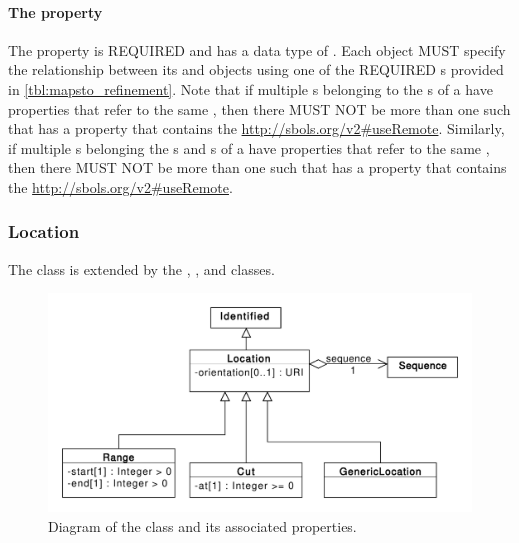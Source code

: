 \paragraph{The  property}\label{sec:refinement}
The  property is REQUIRED and has a data type of . Each  object MUST specify the relationship between its  and   objects using one of the REQUIRED  s provided in \ref{tbl:mapsto_refinement}.
Note that if multiple s belonging to the s of a  have  properties that refer to the same , then there MUST NOT be more than one such  that has a  property that contains the  \url{http://sbols.org/v2\#useRemote}. Similarly, if multiple s belonging the s and s of a  have  properties that refer to the same , then there MUST NOT be more than one such  that has a  property that contains the  \url{http://sbols.org/v2\#useRemote}.


\subsubsection{Location}
\label{sec:Location}
The  class is extended by the , , and  classes.

\begin{figure}[ht]
\begin{center}
\includegraphics[scale=0.6]{uml/location}
\caption[]{Diagram of the  class and its associated properties.}
\label{uml:location}
\end{center}
\end{figure}

